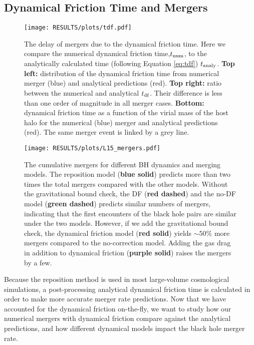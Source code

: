 \subsection{Dynamical Friction Time and Mergers}
\label{sec:merger_stats}

\begin{figure}
\texttt{[image: RESULTS/plots/tdf.pdf]}
\caption{The delay of mergers due to the dynamical friction time. Here we compare the numerical dynamical friction time,$t_{\rm num}$, to the analytically calculated time (following Equation \ref{eq:tdf}) $t_{\rm analy}$. \textbf{Top left:} distribution of the dynamical friction time from numerical merger (blue) and analytical predictions (red). \textbf{Top right:} ratio between the numerical and analytical $t_{\rm df}$. Their difference is less than one order of magnitude in all merger cases. \textbf{Bottom:} dynamical friction time as a function of the virial mass of the host halo for the numerical (blue) merger and analytical predictions (red). The same merger event is linked by a grey line.} 
\label{fig:delay}
\end{figure}

\begin{figure}
\texttt{[image: RESULTS/plots/L15\_mergers.pdf]}
\caption{The cumulative mergers for different BH dynamics and merging models. The reposition model (\textbf{blue solid}) predicts more than two times the total mergers compared with the other models. Without the gravitational bound check, the DF (\textbf{red dashed}) and the no-DF model (\textbf{green dashed}) predicts similar numbers of mergers, indicating that the first encounters of the black hole pairs are similar under the two models. However, if we add the gravitational bound check, the dynamical friction model (\textbf{red solid}) yields $\sim 50\%$ more mergers compared to the no-correction model. Adding the gas drag in addition to dynamical friction (\textbf{purple solid}) raises the mergers by a few. } 
\label{fig:merger_stats}
\end{figure}



Because the reposition method is used in most large-volume cosmological simulations, a post-processing analytical dynamical friction time is calculated in order to make more accurate merger rate predictions. Now that we have accounted for the dynamical friction on-the-fly, we want to study how our numerical mergers with dynamical friction compare against the analytical predictions, and how different dynamical models impact the black hole merger rate.

